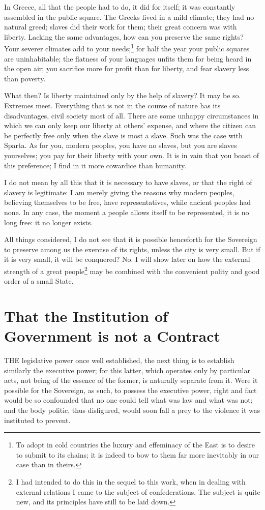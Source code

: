 \documentclass[12pt]{book}
\begin{document}
In Greece, all that the people had to do, it did for itself; it was constantly assembled in the public square. The Greeks lived in a mild climate; they had no natural greed; slaves did their work for them; their great concern was with liberty. Lacking the same advantages, how can you preserve the same rights? Your severer climates add to your needs;\footnote{To adopt in cold countries the luxury and effeminacy of the East is to desire to submit to its chains; it is indeed to bow to them far more inevitably in our case than in theirs.} for half the year your public squares are uninhabitable; the flatness of your languages unfits them for being heard in the open air; you sacrifice more for profit than for liberty, and fear slavery less than poverty.

What then? Is liberty maintained only by the help of slavery? It may be so. Extremes meet. Everything that is not in the course of nature has its disadvantages, civil society most of all. There are some unhappy circumstances in which we can only keep our liberty at others' expense, and where the citizen can be perfectly free only when the slave is most a slave. Such was the case with Sparta. As for you, modern peoples, you have no slaves, but you are slaves yourselves; you pay for their liberty with your own. It is in vain that you boast of this preference; I find in it more cowardice than humanity.

I do not mean by all this that it is necessary to have slaves, or that the right of slavery is legitimate: I am merely giving the reasons why modern peoples, believing themselves to be free, have representatives, while ancient peoples had none. In any case, the moment a people allows itself to be represented, it is no long free: it no longer exists.

All things considered, I do not see that it is possible henceforth for the Sovereign to preserve among us the exercise of its rights, unless the city is very small. But if it is very small, it will be conquered? No. I will show later on how the external strength of a great people\footnote{I had intended to do this in the sequel to this work, when in dealing with external relations I came to the subject of confederations. The subject is quite new, and its principles have still to be laid down.} may be combined with the convenient polity and good order of a small State.

\section{That the Institution of Government is not a Contract}
THE legislative power once well established, the next thing is to establish similarly the executive power; for this latter, which operates only by particular acts, not being of the essence of the former, is naturally separate from it. Were it possible for the Sovereign, as such, to possess the executive power, right and fact would be so confounded that no one could tell what was law and what was not; and the body politic, thus disfigured, would soon fall a prey to the violence it was instituted to prevent.
\end{document}
